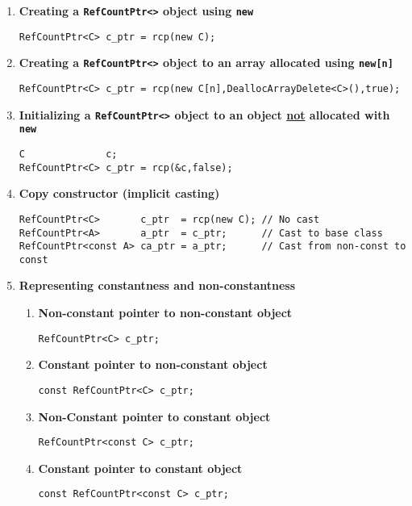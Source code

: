 \documentclass[pdf,ps2pdf,11pt]{SANDreport}
\begin{document}
\begin{enumerate}
\begin{enumerate}
\item {\bf Creating a \texttt{RefCountPtr<>} object using \texttt{new}}
\label{rcpqs:apdx:qs:new}
%
 {\small\begin{verbatim}
RefCountPtr<C> c_ptr = rcp(new C);
\end{verbatim}}
%
\item {\bf Creating a \texttt{RefCountPtr<>} object to an array allocated using \texttt{new[n]}}
\label{rcpqs:apdx:qs:array-new}
%
 {\small\begin{verbatim}
RefCountPtr<C> c_ptr = rcp(new C[n],DeallocArrayDelete<C>(),true);
\end{verbatim}}
%
\item {\bf Initializing a \texttt{RefCountPtr<>} object to an object
       \underline{not} allocated with \texttt{new}}
\label{rcpqs:apdx:qs:not-new}
%
{\small\begin{verbatim}
C              c;
RefCountPtr<C> c_ptr = rcp(&c,false);
\end{verbatim}}
%
\item {\bf Copy constructor (implicit casting)}
%
{\small\begin{verbatim}
RefCountPtr<C>       c_ptr  = rcp(new C); // No cast
RefCountPtr<A>       a_ptr  = c_ptr;      // Cast to base class
RefCountPtr<const A> ca_ptr = a_ptr;      // Cast from non-const to const
\end{verbatim}}
%
\item {\bf Representing constantness and non-constantness}
%
\begin{enumerate}
%
\item {\bf Non-constant pointer to non-constant object }
{\small\begin{verbatim}
RefCountPtr<C> c_ptr;
\end{verbatim}}
%
\item {\bf Constant pointer to non-constant object }
{\small\begin{verbatim}
const RefCountPtr<C> c_ptr;
\end{verbatim}}
%
\item {\bf Non-Constant pointer to constant object }
{\small\begin{verbatim}
RefCountPtr<const C> c_ptr;
\end{verbatim}}
%
\item {\bf Constant pointer to constant object }
{\small\begin{verbatim}
const RefCountPtr<const C> c_ptr;
\end{verbatim}}
%
\end{enumerate}
%
\end{enumerate}


\end{enumerate}
\end{document}
